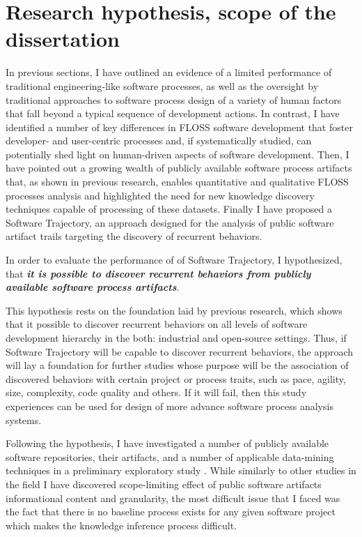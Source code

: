 \section{Research hypothesis, scope of the dissertation}\label{section_research_hypothesis}
In previous sections, I have outlined an evidence of a limited performance of traditional engineering-like 
software processes, as well as the oversight by traditional approaches to software process 
design of a variety of human factors that fall beyond a typical sequence of development actions.
In contrast, I have identified a number of key differences in FLOSS software development that foster 
developer- and user-centric processes and, if systematically studied, can potentially shed light on 
human-driven aspects of software development. 
Then, I have pointed out a growing wealth of publicly available software process artifacts that, as shown
in previous research, enables quantitative and qualitative FLOSS processes analysis and highlighted the 
need for new knowledge discovery techniques capable of processing of these datasets.
Finally I have proposed a Software Trajectory, an approach designed for the analysis of public 
software artifact trails targeting the discovery of recurrent behaviors.

In order to evaluate the performance of of Software Trajectory, I hypothesized, 
that \textbf{\textit{it is possible to discover recurrent behaviors from publicly available software 
process artifacts}}. 

This hypothesis rests on the foundation laid by previous research, which shows that it possible to discover 
recurrent behaviors on all levels of software development hierarchy \cite{citeulike:8347315} in the both: 
industrial \cite{citeulike:5090131} and open-source \cite{citeulike:200721} settings. 
Thus, if Software Trajectory will be capable to discover recurrent behaviors, the approach will lay a foundation 
for further studies whose purpose will be the association of discovered behaviors with certain project or 
process traits, such as pace, agility, size, complexity, code quality and others. 
If it will fail, then this study experiences can be used for design of more advance software process 
analysis systems.

Following the hypothesis, I have investigated a number of publicly available software repositories,
their artifacts, and a number of applicable data-mining techniques in a preliminary exploratory study 
\cite{csdl2-10-09}. While similarly to other studies in the field I have discovered scope-limiting effect 
of public software artifacts informational content and granularity, the most difficult issue that I faced 
was the fact that there is no baseline process exists for any given software project which makes the 
knowledge inference process difficult. 

